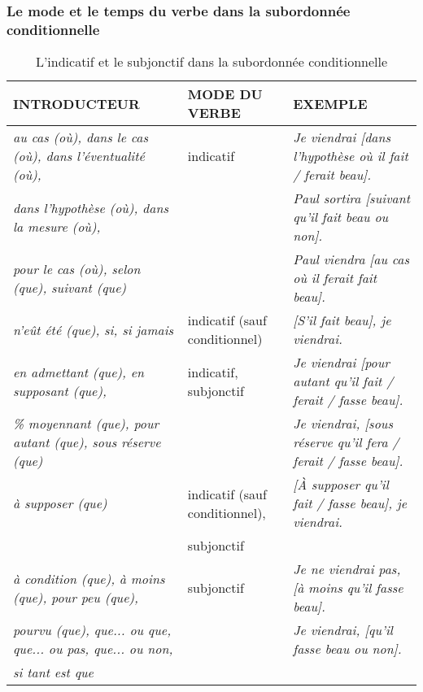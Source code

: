 \documentclass[UTF8]{report}
\begin{document}
\subsubsection{Le mode et le temps du verbe dans la subordonnée conditionnelle}


\begin{table}[H]
    \centering 
    \small
    \begin{adjustbox}{max width = \textwidth}
        \begin{tabular}{|l|l|l|}
        \hline
        \rowcolor{cyan!20}
        \textbf{INTRODUCTEUR} & \textbf{MODE DU VERBE} & \textbf{EXEMPLE} \\
        \hline
        \textit{au cas (où), dans le cas (où), dans l'éventualité (où),} & indicatif & \textit{Je viendrai [dans l'hypothèse où il fait / ferait beau].} \\
        \textit{dans l'hypothèse (où), dans la mesure (où),} & & \textit{Paul sortira [suivant qu'il fait beau ou non].} \\
        \textit{pour le cas (où), selon (que), suivant (que)} & & \textit{Paul viendra [au cas où il ferait fait beau].} \\
        \hline
        \textit{n'eût été (que), si, si jamais} & indicatif (sauf conditionnel) & \textit{[S'il fait beau], je viendrai.} \\
        \hline
        \textit{en admettant (que), en supposant (que),} & indicatif, subjonctif & \textit{Je viendrai [pour autant qu'il fait / ferait / fasse beau].} \\
        \textit{\% moyennant (que), pour autant (que), sous réserve (que)} & & \textit{Je viendrai, [sous réserve qu'il fera / ferait / fasse beau].} \\
        \hline
        \textit{à supposer (que)} & indicatif (sauf conditionnel), & \textit{[À supposer qu'il fait / fasse beau], je viendrai.} \\
        & subjonctif & \\
        \hline
        \textit{à condition (que), à moins (que), pour peu (que),} & subjonctif & \textit{Je ne viendrai pas, [à moins qu'il fasse beau].} \\
        \textit{pourvu (que), que... ou que, que... ou pas, que... ou non,} & & \textit{Je viendrai, [qu'il fasse beau ou non].} \\
        \textit{si tant est que} & & \\
        \hline
        \end{tabular}
    \end{adjustbox}
    \caption{L’indicatif et le subjonctif dans la subordonnée conditionnelle}
\end{table}
\end{document}
